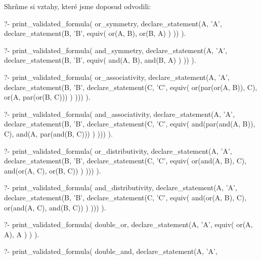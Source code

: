 Shrňme si vztahy, které jsme doposud odvodili:

\begin{fact}
\begin{prolog}
?- print_validated_formula(
	or_symmetry,
	declare_statement(A, 'A', declare_statement(B, 'B',
		equiv(
			or(A, B),
			or(B, A)
		)
	))
).
\end{prolog}
\begin{prolog}
?- print_validated_formula(
	and_symmetry,
	declare_statement(A, 'A', declare_statement(B, 'B',
		equiv(
			and(A, B),
			and(B, A)
		)
	))
).
\end{prolog}
\begin{prolog}
?- print_validated_formula(
	or_associativity,
	declare_statement(A, 'A', declare_statement(B, 'B', declare_statement(C, 'C',
		equiv(
			or(par(or(A, B)), C),
			or(A, par(or(B, C)))
		)
	)))
).
\end{prolog}
\begin{prolog}
?- print_validated_formula(
	and_associativity,
	declare_statement(A, 'A', declare_statement(B, 'B', declare_statement(C, 'C',
		equiv(
			and(par(and(A, B)), C),
			and(A, par(and(B, C)))
		)
	)))
).
\end{prolog}
\begin{prolog}
?- print_validated_formula(
	or_distributivity,
	declare_statement(A, 'A', declare_statement(B, 'B', declare_statement(C, 'C',
		equiv(
			or(and(A, B), C),
			and(or(A, C), or(B, C))
		)
	)))
).
\end{prolog}
\begin{prolog}
?- print_validated_formula(
	and_distributivity,
	declare_statement(A, 'A', declare_statement(B, 'B', declare_statement(C, 'C',
		equiv(
			and(or(A, B), C),
			or(and(A, C), and(B, C))
		)
	)))
).
\end{prolog}
\begin{prolog}
?- print_validated_formula(
	double_or,
	declare_statement(A, 'A',
		equiv(
			or(A, A),
			A
		)
	)
).
\end{prolog}
\begin{prolog}
?- print_validated_formula(
	double_and,
	declare_statement(A, 'A',

\end{prolog}
\end{fact}
